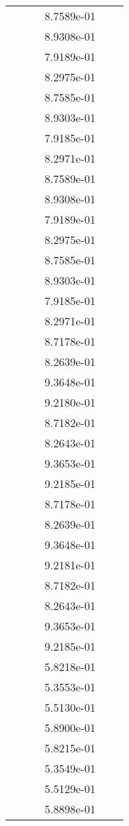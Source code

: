 \begin{xltabular}{\textwidth}{r|rS[table-format=1.3e+2]S[table-format=1.4e+2]S[table-format=1.4e+2]S[table-format=-1.5]}
&  &  & 8.7589e-01 & & \\
&  &  & 8.9308e-01 & & \\
&  &  & 7.9189e-01 & & \\
&  &  & 8.2975e-01 & & \\
&  &  & 8.7585e-01 & & \\
&  &  & 8.9303e-01 & & \\
&  &  & 7.9185e-01 & & \\
&  &  & 8.2971e-01 & & \\
&  &  & 8.7589e-01 & & \\
&  &  & 8.9308e-01 & & \\
&  &  & 7.9189e-01 & & \\
&  &  & 8.2975e-01 & & \\
&  &  & 8.7585e-01 & & \\
&  &  & 8.9303e-01 & & \\
&  &  & 7.9185e-01 & & \\
&  &  & 8.2971e-01 & & \\
&  &  & 8.7178e-01 & & \\
&  &  & 8.2639e-01 & & \\
&  &  & 9.3648e-01 & & \\
&  &  & 9.2180e-01 & & \\
&  &  & 8.7182e-01 & & \\
&  &  & 8.2643e-01 & & \\
&  &  & 9.3653e-01 & & \\
&  &  & 9.2185e-01 & & \\
&  &  & 8.7178e-01 & & \\
&  &  & 8.2639e-01 & & \\
&  &  & 9.3648e-01 & & \\
&  &  & 9.2181e-01 & & \\
&  &  & 8.7182e-01 & & \\
&  &  & 8.2643e-01 & & \\
&  &  & 9.3653e-01 & & \\
&  &  & 9.2185e-01 & & \\
&  &  & 5.8218e-01 & & \\
&  &  & 5.3553e-01 & & \\
&  &  & 5.5130e-01 & & \\
&  &  & 5.8900e-01 & & \\
&  &  & 5.8215e-01 & & \\
&  &  & 5.3549e-01 & & \\
&  &  & 5.5129e-01 & & \\
&  &  & 5.8898e-01 & & \\

\end{xltabular}
